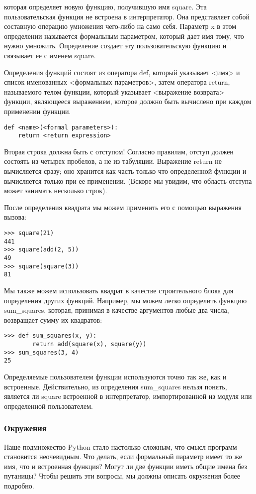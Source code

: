 которая определяет новую функцию, получившую имя square. Эта пользовательская функция не встроена в интерпретатор. Она представляет собой составную операцию умножения чего-либо на само себя. Параметр x в этом определении называется формальным параметром, который дает имя тому, что нужно умножить. Определение создает эту пользовательскую функцию и связывает ее с именем square.

Определения функций состоят из оператора def, который указывает <имя> и список именованных <формальных параметров>, затем оператора return, называемого телом функции, который указывает <выражение возврата> функции, являющееся выражением, которое должно быть вычислено при каждом применении функции.
\begin{verbatim}
def <name>(<formal parameters>):
    return <return expression>
\end{verbatim}

Вторая строка должна быть с отступом! Согласно правилам, отступ должен состоять из четырех пробелов, а не из табуляции. Выражение return не вычисляется сразу; оно хранится как часть только что определенной функции и вычисляется только при ее применении. (Вскоре мы увидим, что область отступа может занимать несколько строк).

После определения квадрата мы можем применить его с помощью выражения вызова:
\begin{verbatim}
>>> square(21)
441
>>> square(add(2, 5))
49
>>> square(square(3))
81
\end{verbatim}

Мы также можем использовать квадрат в качестве строительного блока для определения других функций.
Например, мы можем легко определить функцию sum\_squares, которая, принимая в качестве аргументов любые два числа, возвращает сумму их квадратов:
\begin{verbatim}
>>> def sum_squares(x, y):
        return add(square(x), square(y))
>>> sum_squares(3, 4)
25
\end{verbatim}

Определяемые пользователем функции используются точно так же, как и встроенные.
Действительно, из определения sum\_squares нельзя понять, является ли square встроенной в интерпретатор, импортированной из модуля или определенной пользователем.

\subsubsection{Окружения}
Наше подмножество Python стало настолько сложным, что смысл программ становится неочевидным. Что делать, если формальный параметр имеет то же имя, что и встроенная функция? Могут ли две функции иметь общие имена без путаницы? Чтобы решить эти вопросы, мы должны описать окружения более подробно.

